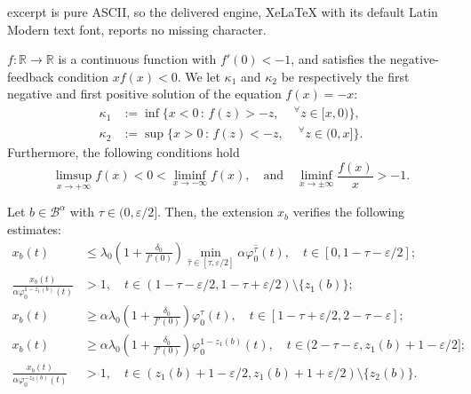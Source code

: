 \documentclass[10pt,a4paper]{amsart}
\newcommand{\B}{\mathcal{B}}
\newcommand{\R}{\mathbb{R}}
\begin{document}
excerpt is pure ASCII, so the delivered engine, XeLaTeX with its default Latin Modern text font, reports no missing character.
\begin{assumption}\label{as:f}
    $f\colon \R\to\R$ is a continuous function with $f'(0)<-1$, and satisfies the negative-feedback condition $xf(x)<0$. We let $\kappa_1$ and $\kappa_2$ be respectively the first negative and first positive solution of the equation $f(x)=-x$:
    \begin{align*}
	\kappa_1&:=\inf\{x<0\,:\, f(z)>-z, \quad  \,^\forall z\in [x, 0)\}, \\ 
	\kappa_2&:=\sup\{x>0\,:\, f(z)<-z,\quad  \,^\forall z\in (0, x]\}. 
    \end{align*}
    Furthermore, the following conditions hold
\[
    \limsup_{x\to +\infty} f(x)<0<\liminf_{x\to-\infty} f(x), \quad \text{and} \quad \liminf_{x\to \pm \infty} \frac{f(x)}{x} > -1.
\]
\end{assumption}

\begin{prop}[Estimates for $\tau\in(0,\varepsilon/2{]}$]\label{prop:estimates1}
Let $b\in\B^\alpha$ with $\tau\in(0,\varepsilon/2]$. Then, the extension $x_b$ verifies the following estimates:
\begin{align}
    x_b(t) &\leq \lambda_0 \left( 1+\frac{\delta_0}{f'(0)} \right) \min_{\hat{\tau}\in [\tau,\varepsilon/2]} \alpha \varphi_0^{\hat{\tau}} (t), \quad t\in[0,1-\tau-\varepsilon/2]; \label{estimate1} \\ 
    \frac{x_b(t)}{\alpha \varphi_0^{1-z_1(b)}(t)} &>1, \quad t\in(1-\tau-\varepsilon/2,1-\tau+\varepsilon/2) \setminus \{ z_1(b) \}; \label{stepness} \\     
    x_b(t) &\geq \alpha\lambda_0 \left( 1+\frac{\delta_0}{f'(0)} \right) \varphi_0^\tau (t), \quad t\in[1-\tau+\varepsilon/2, 2-\tau-\varepsilon];\label{estimate2} \\
    x_b(t) &\geq \alpha\lambda_0 \left( 1+\frac{\delta_0}{f'(0)} \right)\varphi_0^{1-z_1(b)}(t), \quad t\in(2-\tau-\varepsilon,z_1(b)+1-\varepsilon/2]; \label{estimate3} \\ 
    \frac{x_b(t)}{\alpha \varphi_0^{-z_2(b)}(t)} &>1, \quad t\in(z_1(b)+1-\varepsilon/2,z_1(b)+1+\varepsilon/2) \setminus\{ z_2(b) \} \label{stepness2}.
\end{align}
\end{prop}
\end{document}
